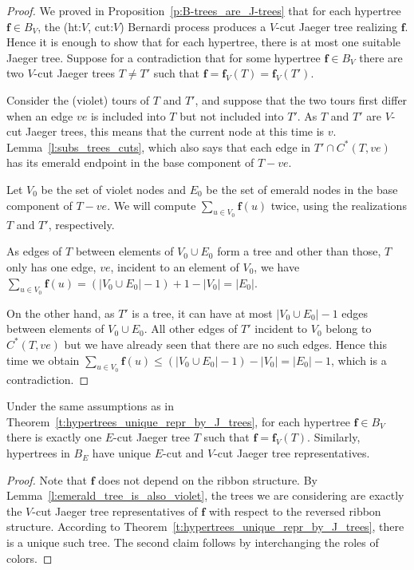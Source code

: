 \documentclass[ALCO,ThmDefs,Unicode,epreuves]{cedram}
\begin{document}
\begin{proof} We proved in Proposition~\ref{p:B-trees_are_J-trees} that for each hypertree $\mathbf f\in B_V$, the (ht:$V$, cut:$V$) Bernardi process produces a $V$-cut Jaeger tree realizing $\mathbf f$. Hence it is enough to show that for each hypertree, there is at most one suitable Jaeger tree. Suppose for a contradiction that for some hypertree $\mathbf f\in B_V$ there are two $V$-cut Jaeger trees $T\neq T'$ such that $\mathbf f=\mathbf f_V(T)=\mathbf f_V(T')$. 
	
Consider the (violet) tours of $T$ and $T'$, and suppose that the two tours first differ when an edge $ve$ is included into $T$ but not included into $T'$. As $T$ and $T'$ are $V$-cut Jaeger trees, this means that the current node at this time is $v$. \cf Lemma~\ref{l:subs_trees_cuts}, which also says that each edge in $T'\cap C^*(T,ve)$ has its emerald endpoint in the base component of $T-ve$. 

Let $V_0$ be the set of violet nodes and $E_0$ be the set of emerald nodes in the base component of $T-ve$. We will compute $\sum_{u\in V_0}\mathbf f(u)$ twice, using the realizations $T$ and $T'$, respectively.

As edges of $T$ between elements of $V_0\cup E_0$ form a tree and other than those, $T$ only has one edge, $ve$, incident to an element of $V_0$, we have $\sum_{u\in V_0}\mathbf f(u)=(|V_0\cup E_0|-1)+1-|V_0|=|E_0|$. 

On the other hand, as $T'$ is a tree, it can have at most $|V_0\cup E_0|-1$ edges between elements of $V_0\cup E_0$. All other edges of $T'$ incident to $V_0$ belong to $C^*(T,ve)$ but we have already seen that there are no such edges. Hence this time we obtain $\sum_{u\in V_0}\mathbf f(u)\le (|V_0\cup E_0|-1)-|V_0|=|E_0|-1$, which is a contradiction.
\end{proof}

\begin{coro}
\label{cor:V_hyper_by_emerald_J_repr}
Under the same assumptions as in Theorem~\ref{t:hypertrees_unique_repr_by_J_trees}, for each hypertree $\mathbf f\in B_V$ there is exactly one $E$-cut Jaeger tree $T$ such that $\mathbf f=\mathbf f_V(T)$. Similarly, hypertrees in $B_E$ have unique $E$-cut and $V$-cut Jaeger tree representatives.
\end{coro}

\begin{proof}
Note that $\mathbf f$ does not depend on the ribbon structure. By Lemma~\ref{l:emerald_tree_is_also_violet}, the trees we are considering are exactly the $V$-cut Jaeger tree representatives of $\mathbf f$ with respect to the reversed ribbon structure. According to Theorem~\ref{t:hypertrees_unique_repr_by_J_trees}, there is a unique such tree. The second claim follows by interchanging the roles of colors.
\end{proof}
\end{document}
